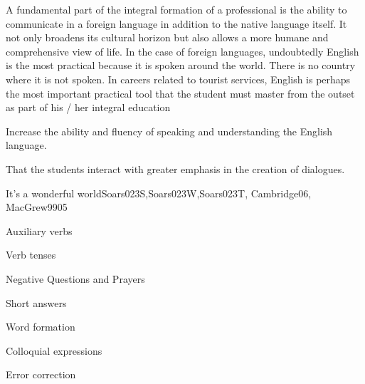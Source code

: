 \begin{syllabus}


\begin{justification}
A fundamental part of the integral formation of a professional is the ability to communicate in a foreign language in addition to the native language itself.
It not only broadens its cultural horizon but also allows a more humane and comprehensive view of life. In the case of foreign languages, undoubtedly English is the most practical because it is spoken around the world. There is no country where it is not spoken. In careers related to tourist services, English is perhaps the most important practical tool that the student must master from the outset as part of his / her integral education
\end{justification}

\begin{goals}
\item Increase the ability and fluency of speaking and understanding the English language.
\item That the students interact with greater emphasis in the creation of dialogues.
\end{goals}

\begin{competences}
    \item {}
\end{competences}

\begin{outcomes}
\item {}
\item {}
\end{outcomes}

\begin{unit}{It's a wonderful world}{Soars023S,Soars023W,Soars023T, Cambridge06, MacGrew99}{0}{5}
   \begin{topics}
      \item Auxiliary verbs
      \item Verb tenses
      \item Negative Questions and Prayers
      \item Short answers
      \item Word formation
      \item Colloquial expressions
      \item Error correction
   \end{topics}


\end{unit}
\end{syllabus}
